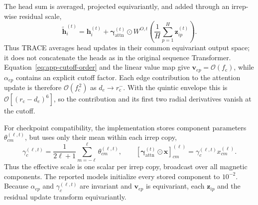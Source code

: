\documentclass[aps,prx,preprint,notitlepage,superscriptaddress,nofootinbib,floatfix]{revtex4-2}
\newcommand{\vect}[1]{\bm{#1}}
\newif\ifshowrevisions
\newenvironment{draftthirtyoneblock}
  {\ifshowrevisions\color{draftthirtyonecolor}\fi}
  {}
\newenvironment{draftthirtytwoblock}
  {\ifshowrevisions\color{draftthirtytwocolor}\fi}
  {}
\begin{document}
\begin{draftthirtyoneblock}
The head sum is averaged, projected equivariantly, and added through an
irrep-wise residual scale,
\begin{equation}
 \widetilde{\vect h}_i^{(t)}
 =
 \vect h_i^{(t)}
 +\vect\gamma_{\mathrm{attn}}^{(t)}\odot
 W^{O,t}\!\left(\frac{1}{H}\sum_{p=1}^{H}\vect z_{ip}^{(t)}\right).
 \label{eq:app-attention-residual}
\end{equation}
Thus TRACE averages head updates in their common equivariant output space; it
does not concatenate the heads as in the original sequence Transformer.
\begin{draftthirtytwoblock}
Equation~\eqref{eq:app-cutoff-order} and the linear value map give
\(\vect v_{ep}=\mathcal O(f_{\mathrm c})\), while \(\alpha_{ep}\) contains an
explicit cutoff factor. Each edge contribution to the attention update is
therefore \(\mathcal O(f_{\mathrm c}^{\,2})\) as
\(d_e\rightarrow r_{\mathrm c}^{-}\). With the quintic envelope this is
\(\mathcal O[(r_{\mathrm c}-d_e)^6]\), so the contribution and its first two
radial derivatives vanish at the cutoff.

For checkpoint compatibility, the implementation stores component parameters
\(\theta_{c m}^{(\ell,t)}\), but uses only their mean within each irrep copy,
\begin{equation}
 \gamma_{c}^{(\ell,t)}
 =\frac{1}{2\ell+1}\sum_{m=-\ell}^{\ell}
 \theta_{c m}^{(\ell,t)} ,
 \qquad
 [\vect\gamma_{\mathrm{attn}}^{(t)}\odot
 \vect x]_{c m}^{(\ell)}
 =\gamma_{c}^{(\ell,t)}x_{c m}^{(\ell)} .
 \label{eq:app-irrep-scale}
\end{equation}
Thus the effective scale is one scalar per irrep copy, broadcast over all
magnetic components. The reported models initialize every stored component
to \(10^{-2}\). Because \(\alpha_{ep}\) and \(\gamma_c^{(\ell,t)}\) are
invariant and \(\vect v_{ep}\) is equivariant, each \(\vect z_{ip}\) and the
residual update transform equivariantly.
\end{draftthirtytwoblock}


\end{draftthirtyoneblock}
\end{document}
